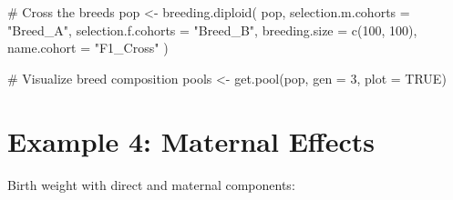\documentclass[
  letterpaper,
]{book}
\newenvironment{Shaded}{\begin{snugshade}}{\end{snugshade}}
\newcommand{\AttributeTok}[1]{\textcolor[rgb]{0.40,0.45,0.13}{#1}}
\newcommand{\CommentTok}[1]{\textcolor[rgb]{0.37,0.37,0.37}{#1}}
\newcommand{\ConstantTok}[1]{\textcolor[rgb]{0.56,0.35,0.01}{#1}}
\newcommand{\DecValTok}[1]{\textcolor[rgb]{0.68,0.00,0.00}{#1}}
\newcommand{\FunctionTok}[1]{\textcolor[rgb]{0.28,0.35,0.67}{#1}}
\newcommand{\NormalTok}[1]{\textcolor[rgb]{0.00,0.23,0.31}{#1}}
\newcommand{\OtherTok}[1]{\textcolor[rgb]{0.00,0.23,0.31}{#1}}
\newcommand{\StringTok}[1]{\textcolor[rgb]{0.13,0.47,0.30}{#1}}
\begin{document}
\begin{Shaded}
\begin{Highlighting}[]
\CommentTok{\# Cross the breeds}
\NormalTok{pop }\OtherTok{\textless{}{-}} \FunctionTok{breeding.diploid}\NormalTok{(}
\NormalTok{  pop,}
  \AttributeTok{selection.m.cohorts =} \StringTok{"Breed\_A"}\NormalTok{,}
  \AttributeTok{selection.f.cohorts =} \StringTok{"Breed\_B"}\NormalTok{,}
  \AttributeTok{breeding.size =} \FunctionTok{c}\NormalTok{(}\DecValTok{100}\NormalTok{, }\DecValTok{100}\NormalTok{),}
  \AttributeTok{name.cohort =} \StringTok{"F1\_Cross"}
\NormalTok{)}

\CommentTok{\# Visualize breed composition}
\NormalTok{pools }\OtherTok{\textless{}{-}} \FunctionTok{get.pool}\NormalTok{(pop, }\AttributeTok{gen =} \DecValTok{3}\NormalTok{, }\AttributeTok{plot =} \ConstantTok{TRUE}\NormalTok{)}
\end{Highlighting}
\end{Shaded}

\section{Example 4: Maternal Effects}\label{sec-example-maternal}

Birth weight with direct and maternal components:
\end{document}
